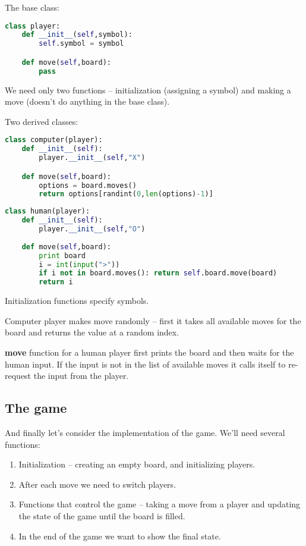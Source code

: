 The base class:

\begin{lstlisting}[language=Python,style=codelst2,caption={Tic-Tac-Toe: player, base class}]
class player:
    def __init__(self,symbol):
        self.symbol = symbol

    def move(self,board):
        pass
\end{lstlisting}
We need only two functions -- initialization (assigning a symbol)
and making a move (doesn't do anything in the base class).

Two derived classes:

\begin{lstlisting}[language=Python,style=codelst2,caption={Tic-Tac-Toe: player-computer}]
class computer(player):
    def __init__(self):
        player.__init__(self,"X")

    def move(self,board):
        options = board.moves()
        return options[randint(0,len(options)-1)]
\end{lstlisting}

\begin{lstlisting}[language=Python,style=codelst2,caption={Tic-Tac-Toe: player accepting moves from a human}]
class human(player):
    def __init__(self):
        player.__init__(self,"O")
    
    def move(self,board):
        print board
        i = int(input(">"))
        if i not in board.moves(): return self.board.move(board)
        return i
\end{lstlisting}

Initialization functions specify symbols.

Computer player makes move randomly -- first it takes all
available moves for the board and returns the value at a random index.

\textbf{move} function for a human player first prints the board and then
waits for the human input. If the input is not in the list of available
moves it calls itself to re-request the input from the player.

\subsection{The game}

And finally let's consider the implementation of the game.
We'll need several functions:
\begin{enumerate}
\item Initialization -- creating an empty board, and initializing players.
\item After each move we need to switch players.
\item Functions that control the game -- taking a move from a player
and updating the state of the game until the board is filled.
\item In the end of the game we want to show the final state.
\end{enumerate}

